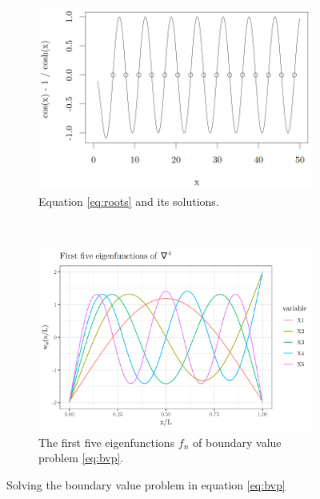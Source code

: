 \documentclass[draft]{article}
\begin{document}
\begin{figure}[tbhp]
    \centering
    \begin{subfigure}[b]{0.48\textwidth}
        \centering
        \includegraphics[width=\textwidth]{figures/eq_roots.png}
        \caption{Equation \ref{eq:roots} and its solutions.}
        \label{subfig:roots}
    \end{subfigure}
    ~
    \begin{subfigure}[b]{0.48\textwidth}
        \centering
        \includegraphics[width=\textwidth]{figures/efuncs.png}
        \caption{The first five eigenfunctions $f_n$ of boundary value problem \ref{eq:bvp}.}
        \label{subfig:efuncs}
    \end{subfigure}
    \caption{Solving the boundary value problem in equation \ref{eq:bvp}}
    \label{fig:bvp_sol}
\end{figure}
\end{document}
